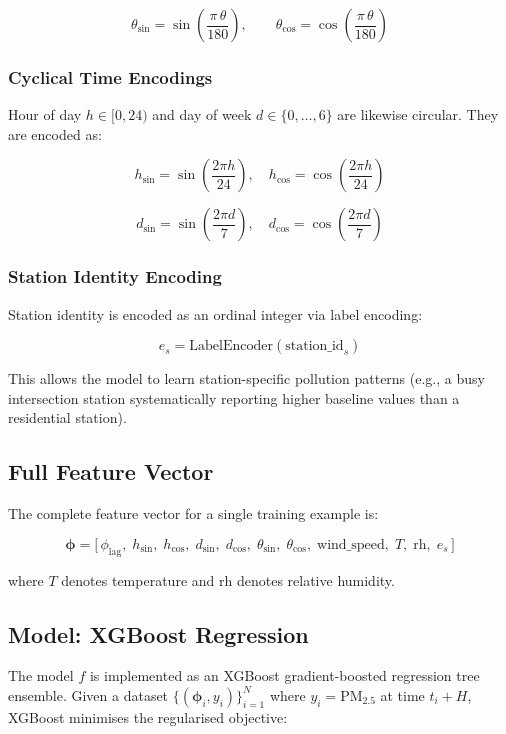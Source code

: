 \documentclass[12pt,a4paper]{article}
\begin{document}
\[
  \theta_{\sin} = \sin\!\left(\frac{\pi\,\theta}{180}\right), \qquad
  \theta_{\cos} = \cos\!\left(\frac{\pi\,\theta}{180}\right)
\]

\subsubsection{Cyclical Time Encodings}

Hour of day $h \in [0, 24)$ and day of week $d \in \{0,\ldots,6\}$ are likewise circular. They are encoded as:

\[
  h_{\sin} = \sin\!\left(\frac{2\pi h}{24}\right),\quad
  h_{\cos} = \cos\!\left(\frac{2\pi h}{24}\right)
\]

\[
  d_{\sin} = \sin\!\left(\frac{2\pi d}{7}\right),\quad
  d_{\cos} = \cos\!\left(\frac{2\pi d}{7}\right)
\]

\subsubsection{Station Identity Encoding}

Station identity is encoded as an ordinal integer via label encoding:

\[
  e_s = \text{LabelEncoder}(\text{station\_id}_s)
\]

This allows the model to learn station-specific pollution patterns (e.g., a busy intersection station systematically reporting higher baseline values than a residential station).

\subsection{Full Feature Vector}

The complete feature vector for a single training example is:

\[
  \boldsymbol{\phi} = \bigl[\,\phi_{\text{lag}},\; h_{\sin},\; h_{\cos},\; d_{\sin},\; d_{\cos},\; \theta_{\sin},\; \theta_{\cos},\; \text{wind\_speed},\; T,\; \text{rh},\; e_s \,\bigr]
\]

where $T$ denotes temperature and $\text{rh}$ denotes relative humidity.

\subsection{Model: XGBoost Regression}

The model $f$ is implemented as an XGBoost gradient-boosted regression tree ensemble. Given a dataset $\{(\boldsymbol{\phi}_i, y_i)\}_{i=1}^{N}$ where $y_i = \text{PM}_{2.5}$ at time $t_i + H$, XGBoost minimises the regularised objective:
\end{document}
